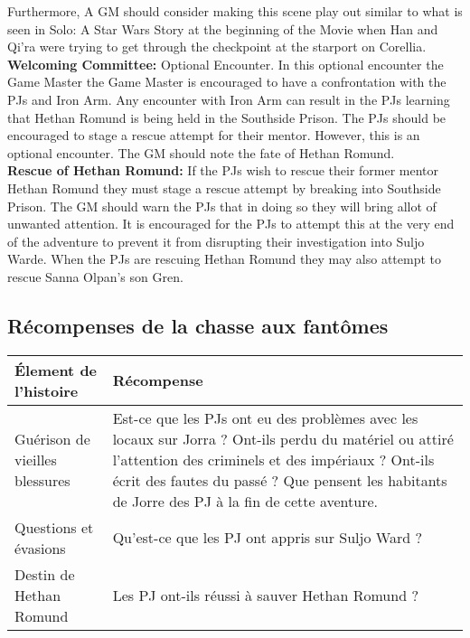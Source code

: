 \documentclass[twoside]{article}
\begin{document}
Furthermore, A GM should consider making this scene play out similar to what is seen in Solo: A Star Wars Story at the beginning of the Movie when Han and Qi'ra were trying to get through the checkpoint at the starport on Corellia.\\

\textbf{Welcoming Committee:} Optional Encounter.  In this optional encounter the Game Master the Game Master is encouraged to have a confrontation with the PJs and Iron Arm.  Any encounter with Iron Arm can result in the PJs learning that Hethan Romund is being held in the Southside Prison.  The PJs should be encouraged to stage a rescue attempt for their mentor.  However, this is an optional encounter.  The GM should note the fate of Hethan Romund.\\

\textbf{Rescue of Hethan Romund:} If the PJs wish to rescue their former mentor Hethan Romund they must stage a rescue attempt by breaking into Southside Prison.  The GM should warn the PJs that in doing so they will bring allot of unwanted attention.  It is encouraged for the PJs to attempt this at the very end of the adventure to prevent it from disrupting their investigation into Suljo Warde.  When the PJs are rescuing Hethan Romund they may also attempt to rescue Sanna Olpan's son Gren.\\


\subsection{Récompenses de la chasse aux fantômes}
\renewcommand{\arraystretch}{1.4}
\begin{tabular}{|p{4cm}|p{12cm}|}
	\hline 
	\cellcolor{DarkRed} {\large \textcolor{PureWhite}{\textbf{Élement de l'histoire}}} & \cellcolor{DarkRed} {\large \textcolor{PureWhite}{\textbf{Récompense}}} \\ 
	\hline 
	Guérison de vieilles blessures & Est-ce que les PJs ont eu des problèmes avec les locaux sur Jorra ? Ont-ils perdu du matériel ou attiré l'attention des criminels et des impériaux ?  Ont-ils écrit des fautes du passé ? Que pensent les habitants de Jorre des PJ à la fin de cette aventure. \\ 
	\hline 
	Questions et évasions & Qu'est-ce que les PJ ont appris sur Suljo Ward ? \\ 
	\hline 
	Destin de Hethan Romund & Les PJ ont-ils réussi à sauver Hethan Romund ? \\ 
	\hline 
\end{tabular} 
\end{document}
